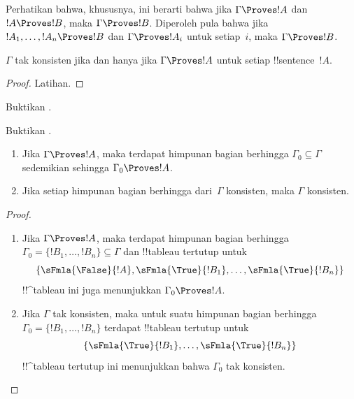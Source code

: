 \documentclass[../../../include/open-logic-section]{subfiles}
\begin{document}
Perhatikan bahwa, khususnya, ini berarti bahwa jika $\Gamma \Proves !A$
dan $!A \Proves !B$, maka $\Gamma \Proves !B$. Diperoleh pula bahwa jika
$!A_1, \dots, !A_n \Proves !B$ dan $\Gamma \Proves !A_i$ untuk
setiap~$i$, maka $\Gamma \Proves !B$.

\begin{prop}
$\Gamma$ tak konsisten jika dan hanya jika $\Gamma \Proves !A$ untuk
setiap !!{sentence}~$!A$.
\end{prop}

\begin{proof}
Latihan.
\end{proof}

\begin{prob}
Buktikan .
\end{prob}
\tagendprob

\begin{prob}
Buktikan .
\end{prob}
\tagendprob

\begin{prop}[Kekompakan]
  \begin{enumerate}
  \item Jika $\Gamma \Proves !A$, maka terdapat himpunan bagian berhingga
    $\Gamma_0 \subseteq \Gamma$ sedemikian sehingga
    $\Gamma_0 \Proves !A$.
  \item Jika setiap himpunan bagian berhingga dari~$\Gamma$ konsisten,
    maka $\Gamma$ konsisten.
  \end{enumerate}
\end{prop}

\begin{proof}
  \begin{enumerate}
    \item Jika $\Gamma \Proves !A$, maka terdapat himpunan bagian
      berhingga $\Gamma_0 = \{!B_1, \dots, !B_n\} \subseteq \Gamma$
      dan !!{tableau}
      tertutup untuk
      \[
      \{\sFmla{\False}{!A}, \sFmla{\True}{!B_1}, \dots,
      \sFmla{\True}{!B_n}\}
      \]
      !!^{tableau} ini juga menunjukkan $\Gamma_0 \Proves !A$.
    \item Jika $\Gamma$ tak konsisten, maka untuk suatu himpunan bagian
      berhingga $\Gamma_0 = \{!B_1, \dots, !B_n\}$ terdapat
      !!{tableau} tertutup untuk
      \[
      \{\sFmla{\True}{!B_1}, \dots, \sFmla{\True}{!B_n}\}
      \]
      !!^{tableau} tertutup ini menunjukkan bahwa $\Gamma_0$ tak
      konsisten.
  \end{enumerate}
\end{proof}
\end{document}
